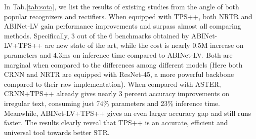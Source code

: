 \documentclass{article}
\begin{document}
\begin{table}[!htb]
\caption{TPS++ evaluation on different recognizers.}
\label{tab:recognizers}
\end{table}


In Tab.\ref{tab:sota}, we list the results of existing studies from the angle of both popular recognizers and rectifiers. When equipped with TPS++, both NRTR and ABINet-LV gain performance improvements and surpass almost all comparing methods. Specifically, 3 out of the 6 benchmarks obtained by ABINet-LV+TPS++ are new state of the art, while the cost is nearly 0.5M increase on parameters and 4.3ms on inference time compared to ABINet-LV. Both are marginal when compared to the differences among different models (Here both CRNN and NRTR are equipped with ResNet-45, a more powerful backbone compared to their raw implementation). When compared with ASTER, CRNN+TPS++ already gives nearly 3 percent accuracy improvements on irregular text, consuming just 74\% parameters and 23\% inference time. Meanwhile, ABINet-LV+TPS++ gives an even larger accuracy gap and still runs faster. The results clearly reveal that TPS++ is an accurate, efficient and universal tool towards better STR. 
\end{document}
